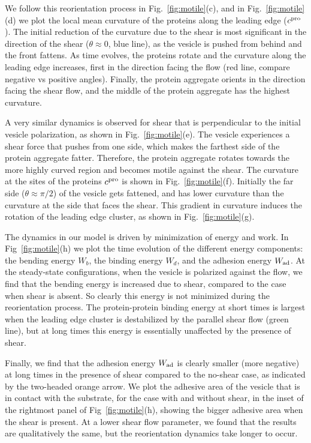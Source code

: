 \documentclass[
reprint,
superscriptaddress,
 amsmath,amssymb,
 aps,
prl,
floatfix]{revtex4-2}
\begin{document}
We follow this reorientation process in Fig.~\ref{fig:motile}(c), and in Fig.~\ref{fig:motile}(d) we plot the local mean curvature
of the proteins along the leading edge ($c^{\rm pro}$). The initial reduction of the curvature due to the shear is most significant in the direction of the shear ($\theta\approx 0$, blue line), as the vesicle is pushed from behind and the front fattens. As time evolves, the proteins rotate and the curvature along the leading edge increases, first in the direction facing the flow (red line, compare negative vs positive angles). Finally, the protein aggregate orients in the direction facing the shear flow, and the middle of the protein aggregate has the highest curvature.

A very similar dynamics is observed for shear that is perpendicular to the initial vesicle polarization, as shown in Fig.~\ref{fig:motile}(e). The vesicle experiences a shear force that pushes from one side, which makes the farthest side of the protein aggregate fatter. Therefore, the protein aggregate rotates towards the more highly curved region and becomes motile against the shear. The curvature at the sites of the proteins $c^{\rm pro}$ is shown in Fig.~\ref{fig:motile}(f). Initially the far side ($\theta \approx \pi/2$) of the vesicle gets fattened, and has lower curvature than the curvature at the side that faces the shear. This gradient in curvature induces the rotation of the leading edge cluster, as shown in Fig.~\ref{fig:motile}(g).

The dynamics in our model is driven by minimization of energy and work. In Fig~\ref{fig:motile}(h) we plot the time evolution of the different energy components: the bending energy $W_b$, the binding energy $W_d$, and the adhesion energy $W_{\rm ad}$. At the steady-state configurations, when the vesicle is polarized against the flow, we find that the bending energy is increased due to shear, compared to the case when shear is absent. So clearly this energy is not minimized during the reorientation process. The protein-protein binding energy at short times is largest when the leading edge cluster is destabilized by the parallel shear flow (green line), but at long times this energy is essentially unaffected by the presence of shear.

Finally, we find that the adhesion energy $W_{\rm ad}$ is clearly smaller (more negative) at long times in the presence of shear compared to the no-shear case, as indicated by the two-headed orange arrow.
We plot the adhesive area of the vesicle that is in contact with the substrate, for the case with and without shear, in the inset of the rightmost panel of Fig~\ref{fig:motile}(h), showing the bigger adhesive area when the shear is present. 
At a lower shear flow parameter, we found that the results are qualitatively the same, but the reorientation dynamics take longer to occur.
\end{document}
